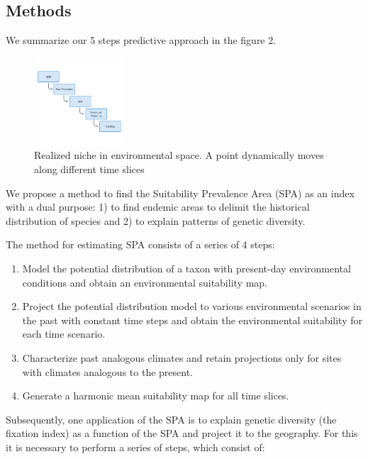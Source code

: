 \documentclass[
]{article}
\providecommand{\tightlist}{%
  \setlength{\itemsep}{0pt}\setlength{\parskip}{0pt}}
\begin{document}
\hypertarget{methods}{%
\subsection{Methods}\label{methods}}

We summarize our 5 steps predictive approach in the figure 2.

\begin{figure}
\centering
\includegraphics[width=0.3\textwidth,height=\textheight]{all_figures/figure_2.png}
\caption{Realized niche in environmental space. A point dynamically
moves along different time slices}
\end{figure}

We propose a method to find the Suitability Prevalence Area (SPA) as an
index with a dual purpose: 1) to find endemic areas to delimit the
historical distribution of species and 2) to explain patterns of genetic
diversity.

The method for estimating SPA consists of a series of 4 steps:

\begin{enumerate}
\def\labelenumi{\arabic{enumi}.}
\tightlist
\item
  Model the potential distribution of a taxon with present-day
  environmental conditions and obtain an environmental suitability map.
\item
  Project the potential distribution model to various environmental
  scenarios in the past with constant time steps and obtain the
  environmental suitability for each time scenario.
\item
  Characterize past analogous climates and retain projections only for
  sites with climates analogous to the present.
\item
  Generate a harmonic mean suitability map for all time slices.
\end{enumerate}

Subsequently, one application of the SPA is to explain genetic diversity
(the fixation index) as a function of the SPA and project it to the
geography. For this it is necessary to perform a series of steps, which
consist of:
\end{document}
